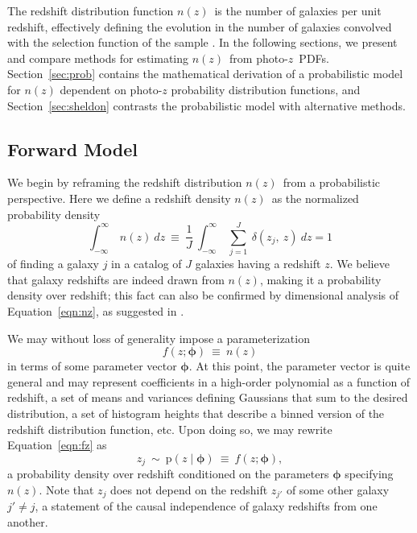 \documentclass[iop]{emulateapj}
\newcommand{\todo}[3]{{\color{#2}\emph{#1}: #3}}
\newcommand{\aim}[1]{\todo{AIM}{red}{#1}}
\newcommand{\Sect}[1]{Section~\ref{#1}}
\newcommand{\Eq}[1]{Equation~\ref{#1}}
\newcommand{\pr}[1]{\ensuremath{\mathrm{p}(#1)}}%
\newcommand{\gvn}{\mid}%
\newcommand{\pz}{photo-$z$}
\newcommand{\pzpdf}{\pz\ PDF}%
\newcommand{\nz}{$n(z)$}
\newcommand{\bvec}[1]{\ensuremath{\boldsymbol{#1}}}%
\newcommand{\ndphi}{\bvec{\phi}}
\begin{document}
The redshift distribution function \nz\ is the number of galaxies per unit redshift, effectively defining the evolution in the number of galaxies convolved with the selection function of the sample \citep{menard_clustering-based_2013}.  
In the following sections, we present and compare methods for estimating \nz\ from \pzpdf s.  
\Sect{sec:prob} contains the mathematical derivation of a probabilistic model for $n(z)$ dependent on photo-$z$ probability distribution functions, and \Sect{sec:sheldon} contrasts the probabilistic model with alternative methods.

\subsection{Forward Model}
\label{sec:forward}

We begin by reframing the redshift distribution \nz\ from a probabilistic perspective.
Here we define a redshift density \nz\ as the normalized probability density
\begin{equation}
\label{eqn:nz}
\int_{-\infty}^{\infty}\ n(z)\ dz\ \equiv\ \frac{1}{J}\ \int_{-\infty}^{\infty}\ \sum_{j=1}^{J}\ \delta(z_{j},\ z)\ dz = 1
\end{equation}
of finding a galaxy $j$ in a catalog of $J$ galaxies having a redshift $z$.
We believe that galaxy redshifts are indeed drawn from \nz, making it a probability density over redshift; this fact can also be confirmed by dimensional analysis of \Eq{eqn:nz}, as suggested in \citet{hogg_data_2012}.

We may without loss of generality impose a parameterization
\begin{equation}
\label{eqn:fz}
f(z; \ndphi)\ \equiv\ n(z)
\end{equation}
in terms of some parameter vector $\ndphi$.
At this point, the parameter vector is quite general and may represent coefficients in a high-order polynomial as a function of redshift, a set of means and variances defining Gaussians that sum to the desired distribution, a set of histogram heights that describe a binned version of the redshift distribution function, etc.
Upon doing so, we may rewrite \Eq{eqn:fz} as 
\begin{equation}
\label{eqn:pz}
z_{j}\ \sim\ \pr{z \gvn \ndphi}\ \equiv\ f(z; \ndphi),
\end{equation}
a probability density over redshift conditioned on the parameters $\ndphi$ specifying \nz.
Note that $z_{j}$ does not depend on the redshift $z_{j'}$ of some other galaxy $j' \neq j$, a statement of the causal independence of galaxy redshifts from one another.
\end{document}
